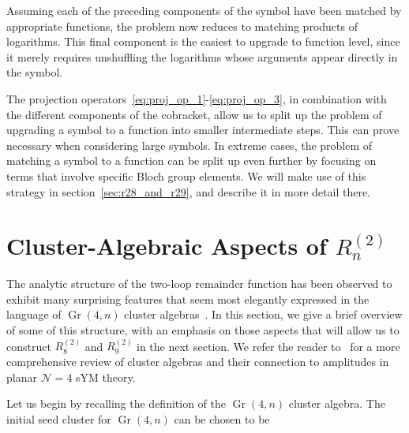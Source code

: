 \documentclass[11pt]{article}
\DeclareMathOperator{\Gr}{Gr}
\def\pdfeq#1{\texorpdfstring{$#1$}{a}}
\begin{document}
Assuming each of the preceding components of the symbol have been matched by appropriate functions, the problem now reduces to matching products of logarithms. This final component is the easiest to upgrade to function level, since it merely requires unshuffling the logarithms whose arguments appear directly in the symbol.  
 
The projection operators~\eqref{eq:proj_op_1}-\eqref{eq:proj_op_3}, in combination with the different components of the cobracket, allow us to split up the problem of upgrading a symbol to a function into smaller intermediate steps. This can prove necessary when considering large symbols. In extreme cases, the problem of matching a symbol to a function can be split up even further by focusing on terms that involve specific Bloch group elements. We will make use of this strategy in section~\ref{sec:r28_and_r29}, and describe it in more detail there. 


\section{Cluster-Algebraic Aspects of \pdfeq{R_n^{(2)}}}
\label{sec:cluster_algebraic_structure}

The analytic structure of the two-loop remainder function has been observed to exhibit many surprising features that seem most elegantly expressed in the language of $\Gr(4,n)$ cluster algebras~\cite{1021.16017}.  In this section, we give a brief overview of some of this structure, with an emphasis on those aspects that will allow us to construct $R_8^{(2)}$\! and $R_9^{(2)}$\! in the next section. We refer the reader to~\cite{Golden:2018gtk} for a more comprehensive review of cluster algebras and their connection to amplitudes in planar $\mathcal{N} = 4$ sYM theory. 

Let us begin by recalling the definition of the $\Gr(4,n)$ cluster algebra. The initial seed cluster for $\Gr(4,n)$ can be chosen to be~\cite{1088.22009}
\end{document}
